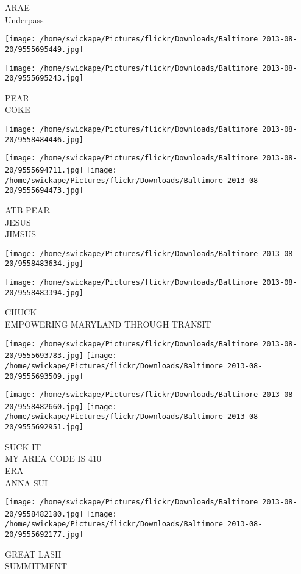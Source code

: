 \documentclass[10pt,letterpaper]{article}
\begin{document}
ARAE\\
Underpass\\
\pagebreak

\texttt{[image: /home/swickape/Pictures/flickr/Downloads/Baltimore 2013-08-20/9555695449.jpg]}

\vspace{0.25in}
\texttt{[image: /home/swickape/Pictures/flickr/Downloads/Baltimore 2013-08-20/9555695243.jpg]}

PEAR\\
COKE\\
\pagebreak

\texttt{[image: /home/swickape/Pictures/flickr/Downloads/Baltimore 2013-08-20/9558484446.jpg]}

\vspace{0.25in}
\texttt{[image: /home/swickape/Pictures/flickr/Downloads/Baltimore 2013-08-20/9555694711.jpg]}
\texttt{[image: /home/swickape/Pictures/flickr/Downloads/Baltimore 2013-08-20/9555694473.jpg]}

ATB PEAR\\
JESUS\\
JIMSUS\\
\pagebreak

\texttt{[image: /home/swickape/Pictures/flickr/Downloads/Baltimore 2013-08-20/9558483634.jpg]}

\vspace{0.25in}
\texttt{[image: /home/swickape/Pictures/flickr/Downloads/Baltimore 2013-08-20/9558483394.jpg]}

CHUCK\\
EMPOWERING MARYLAND THROUGH TRANSIT\\
\pagebreak

\texttt{[image: /home/swickape/Pictures/flickr/Downloads/Baltimore 2013-08-20/9555693783.jpg]}
\texttt{[image: /home/swickape/Pictures/flickr/Downloads/Baltimore 2013-08-20/9555693509.jpg]}

\texttt{[image: /home/swickape/Pictures/flickr/Downloads/Baltimore 2013-08-20/9558482660.jpg]}
\texttt{[image: /home/swickape/Pictures/flickr/Downloads/Baltimore 2013-08-20/9555692951.jpg]}

SUCK IT\\
MY AREA CODE IS 410\\
ERA\\
ANNA SUI\\
\pagebreak

\texttt{[image: /home/swickape/Pictures/flickr/Downloads/Baltimore 2013-08-20/9558482180.jpg]}
\texttt{[image: /home/swickape/Pictures/flickr/Downloads/Baltimore 2013-08-20/9555692177.jpg]}

GREAT LASH\\
SUMMITMENT\\
\pagebreak
\end{document}
